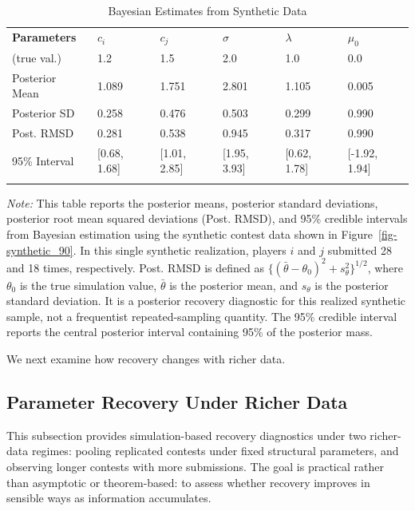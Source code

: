 \documentclass[mnsc]{informs3}
\begin{document}
\begin{table}[htbp]
\centering
\caption{Bayesian Estimates from Synthetic Data}\label{tbl-contest90}
\begin{tabularx}{\textwidth}{lYYYYY}
\toprule
\textbf{Parameters} & \textbf{$c_i$} & \textbf{$c_j$} & \textbf{$\sigma$} & \textbf{$\lambda$} & \textbf{$\mu_0$} \\
\addlinespace[0.25ex]
\addlinespace[0.25ex]
(true val.)        & 1.2 & 1.5 & 2.0 & 1.0 & 0.0 \\
\midrule
 Posterior Mean    & 1.089 & 1.751 & 2.801 & 1.105 & 0.005 \\
 Posterior SD       & 0.258 & 0.476 & 0.503 & 0.299 & 0.990 \\
 Post. RMSD            & 0.281 & 0.538 & 0.945 & 0.317 & 0.990 \\
 95\% Interval
		& [0.68, 1.68]
		& [1.01, 2.85]
		& [1.95, 3.93]
		& [0.62, 1.78]
		& [-1.92, 1.94] \\
\bottomrule
\addlinespace[0.5ex]
\end{tabularx}
\begin{minipage}{\textwidth}
{\footnotesize
\textit{Note:}
This table reports the posterior means, posterior standard deviations, posterior root mean squared deviations (Post. RMSD), and 95\% credible intervals from Bayesian estimation using the synthetic contest data shown in Figure~\ref{fig-synthetic_90}. In this single synthetic realization, players $i$ and $j$ submitted 28 and 18 times, respectively. Post. RMSD is defined as $\{(\bar{\theta}-\theta_0)^2+s_\theta^2\}^{1/2}$, where $\theta_0$ is the true simulation value, $\bar{\theta}$ is the posterior mean, and $s_\theta$ is the posterior standard deviation. It is a posterior recovery diagnostic for this realized synthetic sample, not a frequentist repeated-sampling quantity.
The 95\% credible interval reports the central posterior interval containing 95\% of the posterior mass.
}
\end{minipage}
\end{table}


We next examine how recovery changes with richer data.


\subsection{Parameter Recovery Under Richer Data}

This subsection provides simulation-based recovery diagnostics under two richer-data regimes: pooling replicated contests under fixed structural parameters, and observing longer contests with more submissions.
The goal is practical rather than asymptotic or theorem-based: to assess whether recovery improves in sensible ways as information accumulates.
\end{document}
